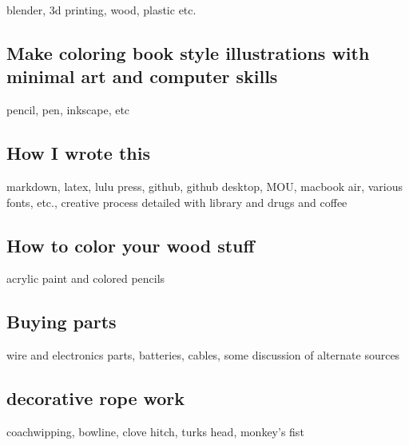blender, 3d printing, wood, plastic etc.

\subsection{Make coloring book style illustrations with minimal art and
computer
skills}\label{make-coloring-book-style-illustrations-with-minimal-art-and-computer-skills}

pencil, pen, inkscape, etc

\subsection{How I wrote this}\label{how-i-wrote-this}

markdown, latex, lulu press, github, github desktop, MOU, macbook air,
various fonts, etc., creative process detailed with library and drugs
and coffee

\subsection{How to color your wood
stuff}\label{how-to-color-your-wood-stuff}

acrylic paint and colored pencils

\subsection{Buying parts}\label{buying-parts}

wire and electronics parts, batteries, cables, some discussion of
alternate sources

\subsection{decorative rope work}\label{decorative-rope-work}

coachwipping, bowline, clove hitch, turks head, monkey's fist
